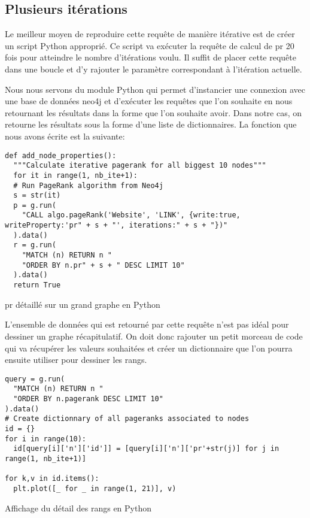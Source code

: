 \documentclass[12pt,twoside, openright]{memoir}
\newcommand{\courrier}[1]{{\fontfamily{qcr}\selectfont {#1}}}
\begin{document}
	\subsection{Plusieurs itérations}
	Le meilleur moyen de reproduire cette requête de manière itérative est de créer un script Python approprié. Ce script va exécuter la requête de calcul de \gls{pr} 20 fois pour atteindre le nombre d'itérations voulu. Il suffit de placer cette requête dans une boucle \courrier{for} et d'y rajouter le paramètre correspondant à l'itération actuelle.\par
	Nous nous servons du module Python \courrier{py2neo} qui permet d'instancier une connexion avec une base de données neo4j et d'exécuter les requêtes que l'on souhaite en nous retournant les résultats dans la forme que l'on souhaite avoir. Dans notre cas, on retourne les résultats sous la forme d'une liste de dictionnaires.\newpage
	La fonction que nous avons écrite est la suivante:
	\begin{listing}
		\begin{verbatim}
def add_node_properties():
  """Calculate iterative pagerank for all biggest 10 nodes"""
  for it in range(1, nb_ite+1):
  # Run PageRank algorithm from Neo4j
  s = str(it)
  p = g.run(
    "CALL algo.pageRank('Website', 'LINK', {write:true, writeProperty:'pr" + s + "', iterations:" + s + "})"
  ).data()
  r = g.run(
    "MATCH (n) RETURN n "
    "ORDER BY n.pr" + s + " DESC LIMIT 10"
  ).data()
  return True
		\end{verbatim}
		\caption{\gls{pr} détaillé sur un grand graphe en Python}
	\end{listing}\par
	L'ensemble de données qui est retourné par cette requête n'est pas idéal pour dessiner un graphe récapitulatif. On doit donc rajouter un petit morceau de code qui va récupérer les valeurs souhaitées et créer un dictionnaire que l'on pourra ensuite utiliser pour dessiner les rangs.\par
	\begin{listing}
		\begin{verbatim}
query = g.run(
  "MATCH (n) RETURN n "
  "ORDER BY n.pagerank DESC LIMIT 10"
).data()
# Create dictionnary of all pageranks associated to nodes
id = {}
for i in range(10):
  id[query[i]['n']['id']] = [query[i]['n']['pr'+str(j)] for j in range(1, nb_ite+1)]

for k,v in id.items():
  plt.plot([_ for _ in range(1, 21)], v)
		\end{verbatim}
		\caption{Affichage du détail des rangs en Python}
	\end{listing}
\end{document}
